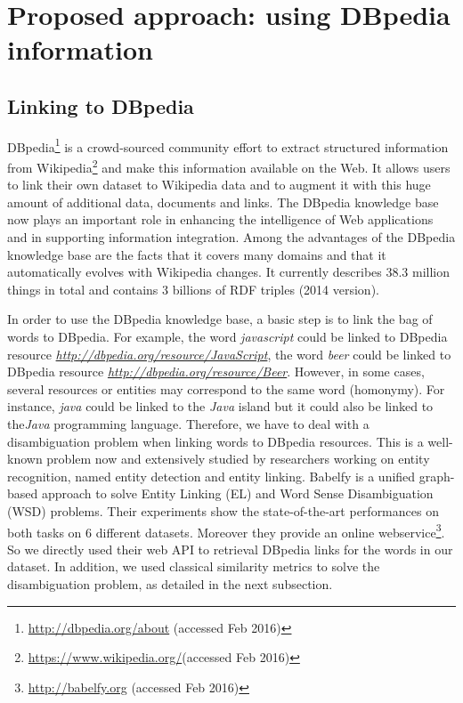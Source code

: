 \section{Proposed approach: using DBpedia information}
\label{sec:chp6secSolution}

\subsection{Linking to DBpedia}

DBpedia\footnote{\url{http://dbpedia.org/about} (accessed Feb 2016)} is a crowd-sourced community effort to extract structured information from Wikipedia\footnote{\url{https://www.wikipedia.org/}(accessed Feb 2016)} and make this information available on the Web. It allows users to link their own dataset to Wikipedia data and to augment it with this huge amount of additional data, documents and links. The DBpedia knowledge base now plays an important role in enhancing the intelligence of Web applications and in supporting information integration. Among the advantages of the DBpedia knowledge base are the facts that it covers many domains and that it automatically evolves with Wikipedia changes. It currently describes 38.3 million things in total and contains 3 billions of RDF triples (2014 version).


In order to use the DBpedia knowledge base, a basic step is to link the bag of words to DBpedia. For example, the word \textit{javascript} could be linked to DBpedia resource \textit{\url{http://dbpedia.org/resource/JavaScript}}, the word \textit{beer} could be linked to DBpedia resource	\textit{\url{http://dbpedia.org/resource/Beer}}. However, in some cases, several resources or entities may correspond to the same word (homonymy). For instance, \textit{java} could be linked to the \textit{Java} island but it could also be linked to the\textit{Java} programming language. Therefore, we have to deal with a disambiguation problem when linking words to DBpedia resources. This is a well-known problem now and extensively studied by researchers working on entity recognition, named entity detection and entity linking.  
Babelfy\cite{chp6babelfy:Moroetal:14tacl} is a unified graph-based approach to solve Entity Linking (EL) and Word Sense Disambiguation (WSD) problems. Their experiments show the state-of-the-art performances on both tasks on 6 different datasets. Moreover they provide an online webservice\footnote{\url{http://babelfy.org} (accessed Feb 2016)}. So we directly used their web API to retrieval DBpedia links for the words in our dataset. In addition, we used classical similarity metrics to solve the disambiguation problem, as detailed in the next subsection.

